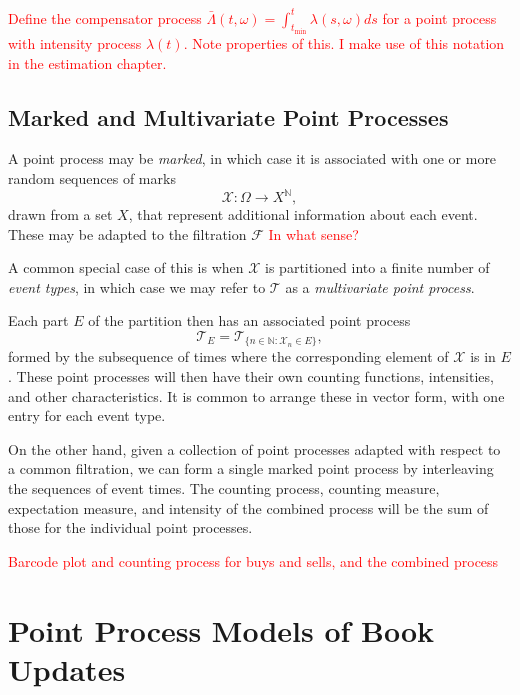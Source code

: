 \documentclass[honours,12pt]{unswthesis}
\numberwithin{equation}{section}
\begin{document}
\textcolor{red}{Define the compensator process $\bar\Lambda(t,\omega)=\int_{t_\mathrm{min}}^t \lambda(s,\omega)ds$ for a point process with intensity process $\lambda(t)$. Note properties of this. I make use of this notation in the estimation chapter.}

\subsection{Marked and Multivariate Point Processes}

A point process  may be \textit{marked}, in which case it is associated with one or more random sequences of marks $$\mathcal{X}:\Omega\to X^\mathbb{N},$$
drawn from a set $X$, that represent additional information about each event. These may be adapted to the filtration $\mathcal{F}$ \textcolor{red}{In what sense?}

A common special case of this is when $\mathcal{X}$ is partitioned into a finite number of \textit{event types}, in which case we may refer to $\mathcal{T}$ as a \textit{multivariate point process}.

Each part $E$ of the partition then has an associated point process $$\mathcal{T}_E = \mathcal{T}_{\{n\in\mathbb{N} : \mathcal{X}_n\in E\}},$$ formed by the subsequence of times where the corresponding element of $\mathcal{X}$ is in $E$. These point processes will then have their own counting functions, intensities, and other characteristics. It is common to arrange these in vector form, with one entry for each event type.

On the other hand, given a collection of point processes adapted with respect to a common filtration, we can form a single marked point process by interleaving the sequences of event times. The counting process, counting measure, expectation measure, and intensity of the combined process will be the sum of those for the individual point processes.

\textcolor{red}{Barcode plot and counting process for buys and sells, and the combined process}



\section{Point Process Models of Book Updates}
\end{document}
